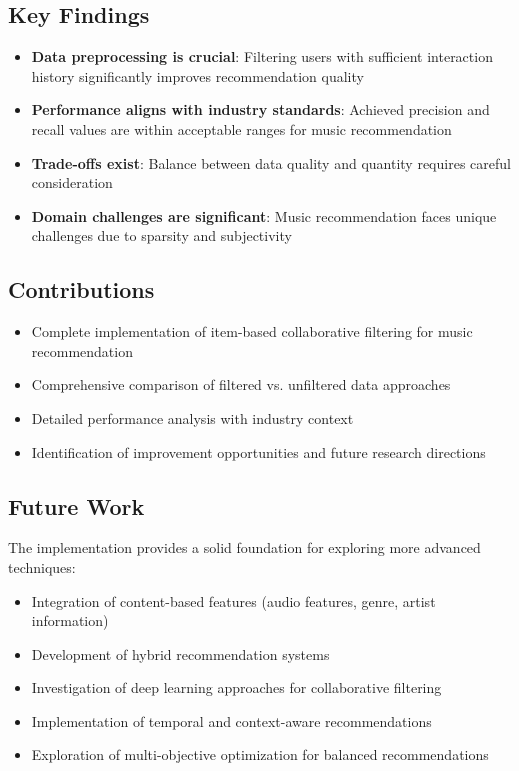 \documentclass[12pt,a4paper]{article}
\begin{document}
\subsection{Key Findings}
\begin{itemize}
    \item \textbf{Data preprocessing is crucial}: Filtering users with sufficient interaction history significantly improves recommendation quality
    \item \textbf{Performance aligns with industry standards}: Achieved precision and recall values are within acceptable ranges for music recommendation
    \item \textbf{Trade-offs exist}: Balance between data quality and quantity requires careful consideration
    \item \textbf{Domain challenges are significant}: Music recommendation faces unique challenges due to sparsity and subjectivity
\end{itemize}

\subsection{Contributions}
\begin{itemize}
    \item Complete implementation of item-based collaborative filtering for music recommendation
    \item Comprehensive comparison of filtered vs. unfiltered data approaches
    \item Detailed performance analysis with industry context
    \item Identification of improvement opportunities and future research directions
\end{itemize}

\subsection{Future Work}
The implementation provides a solid foundation for exploring more advanced techniques:
\begin{itemize}
    \item Integration of content-based features (audio features, genre, artist information)
    \item Development of hybrid recommendation systems
    \item Investigation of deep learning approaches for collaborative filtering
    \item Implementation of temporal and context-aware recommendations
    \item Exploration of multi-objective optimization for balanced recommendations
\end{itemize}
\end{document}
